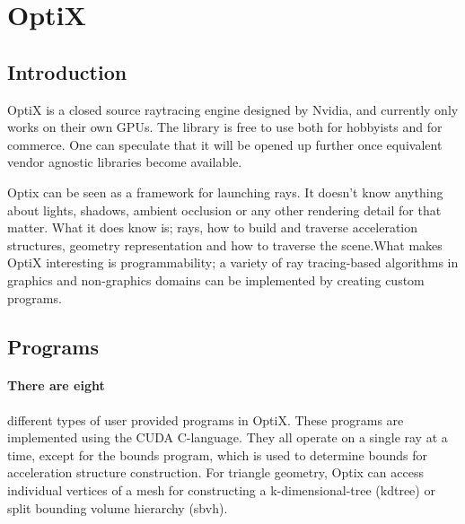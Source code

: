 \section{OptiX}

\subsection{Introduction}
OptiX is a closed source raytracing engine designed by Nvidia, and currently only works on their own GPUs. The library is free to use both for hobbyists and for commerce. One can speculate that it will be opened up further once equivalent vendor agnostic libraries become available.

Optix can be seen as a framework for launching rays. It doesn't know anything about lights, shadows, ambient occlusion or any other rendering detail for that matter. What it does know is; rays, how to build and traverse acceleration structures, geometry representation and how to traverse the scene.What makes OptiX interesting is programmability; a variety of ray tracing-based algorithms in graphics and non-graphics domains can be implemented \cite{Parker10OptiX} by creating custom programs.

\subsection{Programs}
\paragraph{There are eight} different types of user provided programs in OptiX. These programs are implemented using the CUDA C-language. They all operate on a single ray at a time, except for the bounds program, which is used to determine bounds for acceleration structure construction. For triangle geometry, Optix can access individual vertices of a mesh for constructing a k-dimensional-tree (kdtree) or split bounding volume hierarchy  (sbvh).

